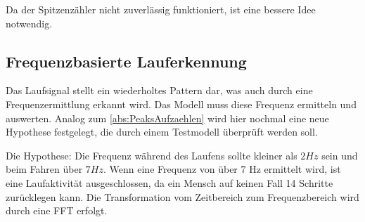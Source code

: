 


Da der Spitzenzähler nicht zuverlässig funktioniert, ist eine bessere Idee notwendig. 


\subsection{Frequenzbasierte Lauferkennung} %

Das Laufsignal stellt ein wiederholtes Pattern dar, was auch durch eine Frequenzermittlung erkannt wird.
Das Modell muss diese Frequenz ermitteln und auswerten.
Analog zum \autoref{abs:PeaksAufzaehlen} wird hier nochmal eine neue Hypothese festgelegt, die durch einem Testmodell überprüft werden soll.

Die Hypothese: Die Frequenz während des Laufens sollte kleiner als $2 Hz$ sein und beim Fahren über $7 Hz$. Wenn eine Frequenz von über $7$ Hz ermittelt wird, ist eine Laufaktivität ausgeschlossen, da ein Mensch auf keinen Fall 14 Schritte zurücklegen kann. Die Transformation vom Zeitbereich zum Frequenzbereich wird durch eine FFT erfolgt.

